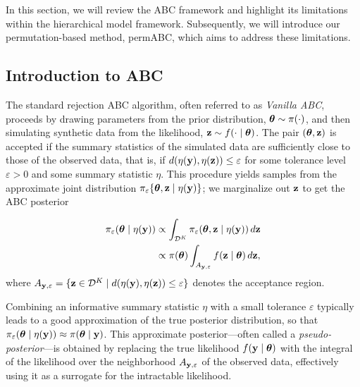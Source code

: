
In this section, we will review the ABC framework and highlight its limitations within the hierarchical model framework. Subsequently, we will introduce our permutation-based method, permABC, which aims to address these limitations.

\subsection{Introduction to ABC}


The standard rejection ABC algorithm, often referred to as \emph{Vanilla ABC}, proceeds by drawing parameters from the prior distribution, $\boldsymbol{\theta} \sim \pi(\cdot)$, and then simulating synthetic data from the likelihood, $\mathbf{z} \sim f(\cdot \mid \boldsymbol{\theta})$. The pair $(\boldsymbol{\theta}, \mathbf{z})$ is accepted if the summary statistics of the simulated data are sufficiently close to those of the observed data, that is, if $d(\eta(\mathbf{y}), \eta(\mathbf{z})) \leq \varepsilon$ for some tolerance level $\varepsilon > 0$ and some summary statistic $\eta$. This procedure yields samples from the approximate joint distribution $\pi_{\varepsilon}\{\boldsymbol{\theta},\mathbf{z} \mid \eta(\mathbf{y})\}$; we marginalize out $\mathbf{z}$ to get the ABC posterior

\begin{equation}
    \label{eqabc}
    \begin{split}
        \pi_{\varepsilon}(\boldsymbol{\theta} \mid \eta(\mathbf{y})) &\propto
        \int_{\mathcal{D}^K} \pi_{\varepsilon}(\boldsymbol{\theta}, \mathbf{z} \mid \eta(\mathbf{y})) \, d\mathbf{z} \\
        &\propto \pi(\boldsymbol{\theta}) \int_{A_{\mathbf{y},\varepsilon}} f(\mathbf{z} \mid \boldsymbol{\theta}) \, d\mathbf{z},
    \end{split}
\end{equation}
where $A_{\mathbf{y},\varepsilon} = \{\mathbf{z} \in \mathcal{D}^K \mid d(\eta(\mathbf{y}), \eta(\mathbf{z})) \leq \varepsilon\}$ denotes the acceptance region.

Combining an informative summary statistic $\eta$ with a small tolerance $\varepsilon$ typically leads to a good approximation of the true posterior distribution, so that $\pi_{\varepsilon}(\boldsymbol{\theta} \mid \eta(\mathbf{y})) \approx \pi(\boldsymbol{\theta} \mid \mathbf{y})$. This approximate posterior—often called a \emph{pseudo-posterior}—is obtained by replacing the true likelihood $f(\mathbf{y} \mid \boldsymbol{\theta})$ with the integral of the likelihood over the neighborhood $A_{\mathbf{y},\varepsilon}$ of the observed data, effectively using it as a surrogate for the intractable likelihood.

